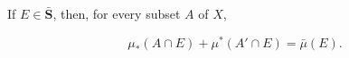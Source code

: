 If $E \in \bar{\mathbf{S}}$, then, for every subset $A$ of $X$,

$$\mu_*(A \cap E) + \mu^*(A' \cap E) = \bar{\mu}(E).$$
